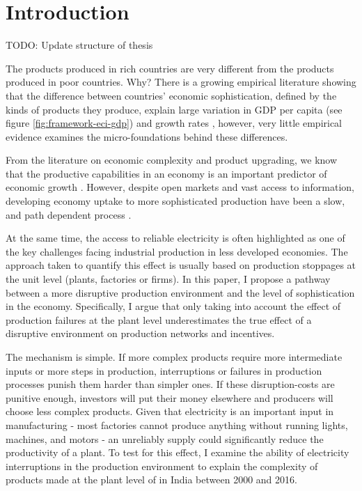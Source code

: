 \documentclass[11pt]{article}
\begin{document}
% 






\section{Introduction}\label{sec:introduction}

TODO: Update structure of thesis

The products produced in rich countries are very different from the products produced in poor countries. Why? There is a growing empirical literature showing that the difference between countries' economic sophistication, defined by the kinds of products they produce, explain large variation in GDP per capita (see figure \ref{fig:framework-eci-gdp}) and growth rates \citep{tacchella_dynamical_2018}, however, very little empirical evidence examines the micro-foundations behind these differences.

From the literature on economic complexity and product upgrading, we know that the productive capabilities in an economy is an important predictor of economic growth \citep{hausmann_network_2011}. However, despite open markets and vast access to information, developing economy uptake to more sophisticated production have been a slow, and path dependent process \citep{hidalgo_product_2007}.

At the same time, the access to reliable electricity is often highlighted as one of the key challenges facing industrial production in less developed economies. The approach taken to quantify this effect is usually based on production stoppages at the unit level (plants, factories or firms). In this paper, I propose a pathway between a more disruptive production environment and the level of sophistication in the economy. Specifically, I argue that only taking into account the effect of production failures at the plant level underestimates the true effect of a disruptive environment on production networks and incentives.

The mechanism is simple. If more complex products require more intermediate inputs or more steps in production, interruptions or failures in production processes punish them harder than simpler ones. If these disruption-costs are punitive enough, investors will put their money elsewhere and producers will choose less complex products. Given that electricity is an important input in manufacturing -  most factories cannot produce anything without running lights, machines, and motors - an unreliably supply could significantly reduce the productivity of a plant. To test for this effect, I examine the ability of electricity interruptions in the production environment to explain the complexity of products made at the plant level of in India between 2000 and 2016. 
\end{document}
